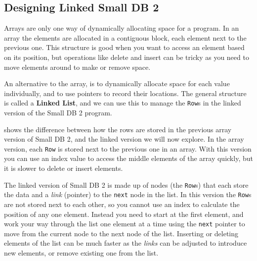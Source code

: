


\clearpage
\subsection{Designing Linked Small DB 2} %
\label{sub:designing_linked_list}

Arrays are only one way of dynamically allocating space for a program. In an array the elements are allocated in a contiguous block, each element next to the previous one. This structure is good when you want to access an element based on its position, but operations like delete and insert can be tricky as you need to move elements around to make or remove space.

An alternative to the array, is to dynamically allocate space for each value individually, and to use pointers to record their locations. The general structure is called a \textbf{Linked List}, and we can use this to manage the \texttt{Row}s in the linked version of the Small DB 2 program.

 shows the difference between how the rows are stored in the previous array version of Small DB 2, and the linked version we will now explore. In the array version, each \texttt{Row} is stored next to the previous one in an array. With this version you can use an index value to access the middle elements of the array quickly, but it is slower to delete or insert elements. 

The linked version of Small DB 2 is made up of nodes (the \texttt{Row}s) that each store the data and a \emph{link} (pointer) to the \texttt{next} node in the list. In this version the \texttt{Row}s are not stored next to each other, so you cannot use an index to calculate the position of any one element. Instead you need to start at the first element, and work your way through the list one element at a time using the \texttt{next} pointer to move from the current node to the next node of the list. Inserting or deleting elements of the list can be much faster as the \emph{links} can be adjusted to introduce new elements, or remove existing one from the list.

